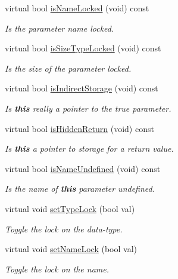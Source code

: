 \begin{DoxyCompactItemize}
virtual bool \mbox{\hyperlink{class_parameter_symbol_aeadfb7be82e97a45d3f7bc661ce09bea}{is\+Name\+Locked}} (void) const
\begin{DoxyCompactList}\small\item\em Is the parameter name locked. \end{DoxyCompactList}\item 
virtual bool \mbox{\hyperlink{class_parameter_symbol_ab248a298389e7b04175de72a49275d31}{is\+Size\+Type\+Locked}} (void) const
\begin{DoxyCompactList}\small\item\em Is the size of the parameter locked. \end{DoxyCompactList}\item 
virtual bool \mbox{\hyperlink{class_parameter_symbol_a664deaea278dd7353fe391f94233cfd0}{is\+Indirect\+Storage}} (void) const
\begin{DoxyCompactList}\small\item\em Is {\bfseries{this}} really a pointer to the true parameter. \end{DoxyCompactList}\item 
virtual bool \mbox{\hyperlink{class_parameter_symbol_ac05ae5af47313c5cebff093434c68a97}{is\+Hidden\+Return}} (void) const
\begin{DoxyCompactList}\small\item\em Is {\bfseries{this}} a pointer to storage for a return value. \end{DoxyCompactList}\item 
virtual bool \mbox{\hyperlink{class_parameter_symbol_a6a2fd9c22592c3e7144b3eb3ff349fe6}{is\+Name\+Undefined}} (void) const
\begin{DoxyCompactList}\small\item\em Is the name of {\bfseries{this}} parameter undefined. \end{DoxyCompactList}\item 
virtual void \mbox{\hyperlink{class_parameter_symbol_a87a4c3430377ccdd1efa5c3c4d720e9c}{set\+Type\+Lock}} (bool val)
\begin{DoxyCompactList}\small\item\em Toggle the lock on the data-\/type. \end{DoxyCompactList}\item 
virtual void \mbox{\hyperlink{class_parameter_symbol_a1a69d14c3fd3a083f36a0c47b633ea28}{set\+Name\+Lock}} (bool val)
\begin{DoxyCompactList}\small\item\em Toggle the lock on the name. \end{DoxyCompactList}\item 

\end{DoxyCompactItemize}
